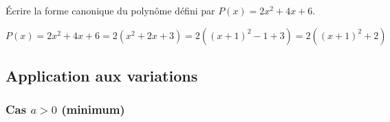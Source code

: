 \documentclass[french]{book}
\newcommand{\vect}[1]{\overrightarrow{#1}}
\newcommand{\oij}{(\textit{O},{\overrightarrow{i}},{\overrightarrow{j}})}
\newcommand{\cp}[2]{%
        \begin{pmatrix}
        #1\\
        #2
        \end{pmatrix}%
        }
\begin{document}
\begin{exemple}
Écrire la forme canonique du polynôme défini par $P(x)=2x^{2}+4x+6$.
\end{exemple}


$P(x)=2x^{2}+4x+6=2\left(x^{2}+2x+3\right)=2\left((x+1)^{2}-1+3\right)=2\left((x+1)^{2}+2\right)$

\newpage

\subsection{Application aux variations}
%
%
%
  
\subsubsection*{Cas $a>0$ (minimum)}
\end{document}
